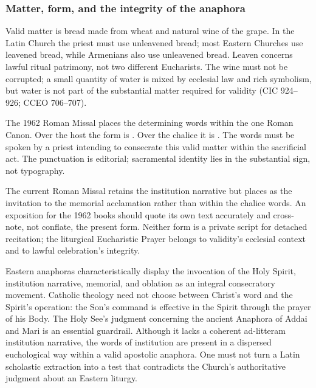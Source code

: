 \subsubsection{Matter, form, and the integrity of the anaphora}

Valid matter is bread made from wheat and natural wine of the grape. In the Latin Church the priest must use unleavened bread; most Eastern Churches use leavened bread, while Armenians also use unleavened bread. Leaven concerns lawful ritual patrimony, not two different Eucharists. The wine must not be corrupted; a small quantity of water is mixed by ecclesial law and rich symbolism, but water is not part of the substantial matter required for validity (CIC 924--926; CCEO 706--707).

The 1962 Roman Missal places the determining words within the one Roman Canon. Over the host the form is . Over the chalice it is . The words must be spoken by a priest intending to consecrate this valid matter within the sacrificial act. The punctuation is editorial; sacramental identity lies in the substantial sign, not typography.

The current Roman Missal retains the institution narrative but places  as the invitation to the memorial acclamation rather than within the chalice words. An exposition for the 1962 books should quote its own text accurately and cross-note, not conflate, the present form. Neither form is a private script for detached recitation; the liturgical Eucharistic Prayer belongs to validity's ecclesial context and to lawful celebration's integrity.

Eastern anaphoras characteristically display the invocation of the Holy Spirit, institution narrative, memorial, and oblation as an integral consecratory movement. Catholic theology need not choose between Christ's word and the Spirit's operation: the Son's command is effective in the Spirit through the prayer of his Body. The Holy See's judgment concerning the ancient Anaphora of Addai and Mari is an essential guardrail. Although it lacks a coherent ad-litteram institution narrative, the words of institution are present in a dispersed euchological way within a valid apostolic anaphora. One must not turn a Latin scholastic extraction into a test that contradicts the Church's authoritative judgment about an Eastern liturgy.

